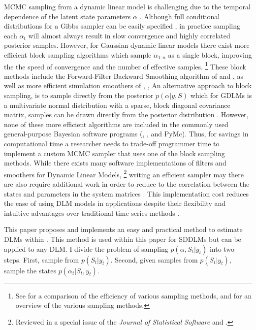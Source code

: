 MCMC sampling from a dynamic linear model is challenging due to the temporal dependence of the latent state parameters $\alpha$ \parencite{ReisSalazarGamerman2006}.
Although full conditional distributions for a Gibbs sampler can be easily specified \parencite{CarlinGelfandSmith1992}, in practice sampling each $\alpha_{t}$ will almost always result in slow convergence and highly correlated posterior samples.
However, for Gaussian dynamic linear models there exist more efficient block sampling algorithms which sample $\alpha_{1:n}$ as a single block, improving the the speed of convergence and the number of effective samples.%
\footnote{See \textcite{ReisSalazarGamerman2006} for a comparison of the efficiency of various sampling methods, and \textcite{migon2005dynamic} for an overview of the various sampling methods.}
These block methods include the Forward-Filter Backward Smoothing algorithm of \textcite{CarterKohn1994} and \textcite{Fruehwirth-Schnatter1994}, as well as more efficient simulation smoothers of \textcite{DeJongShephard1995}, \textcite{DurbinKoopman2002}, \textcite{StricklandTurnerDenhamEtAl2009}%
An alternative approach to block sampling, is to sample directly from the posterior $p(\alpha | y, S)$ which for GDLMs is a multivariate normal distribution with a sparse, block diagonal covariance matrix, samples can be drawn directly from the posterior distribution \parencites{migon2005dynamic}{ChanJeliazkov2009}.
However, none of these more efficient algorithms are included in the commonly used general-purpose Bayesian software programs (, , and PyMc).
Thus, for savings in computational time a researcher needs to trade-off programmer time to implement a custom MCMC sampler that uses one of the block sampling methods.
While there exists many software implementations of filters and smoothers for Dynamic Linear Models,%
\footnote{Reviewed in a special issue of the \textit{Journal of Statistical Software} \textcite{CommandeurKoopmanOoms2011} and \textcite{Tusell2011}.}
writing an efficient sampler may there are also require additional work in order to reduce to the correlation between the states and parameters in the system matrices \parencites{ReisSalazarGamerman2006}{ChibNardariShephard2006}.
This implementation cost reduces the ease of using DLM models in applications despite their flexibility and intuitive advantages over traditional time series methods \textcite[51]{DurbinKoopman2001}.

This paper proposes and implements an easy and practical method to estimate DLMs within \Stan{} \parencite{Stan2013}.
This method is used within this paper for SDDLMs but can be applied to any DLM.
I divide the problem of sampling $p(\alpha, S_{t} | y_{t})$ into two steps.
First, sample from $p(S_{t} | y_{t})$. 
Second, given samples from $p(S_{t} | y_{t})$, sample the states $p(\alpha_{t} | S_{t}, y_{t})$.

